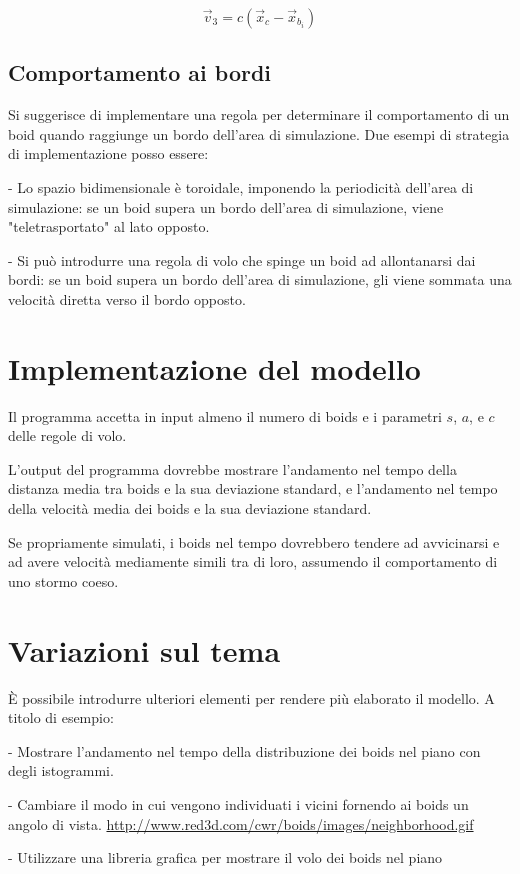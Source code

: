\documentclass[]{article}
\begin{document}
$$\vec{v}_3 = c(\vec{x}_{c}-\vec{x}_{b_i})$$

\subsection{Comportamento ai bordi}

Si suggerisce di implementare una regola per determinare il comportamento di un boid
quando raggiunge un bordo dell'area di simulazione. Due esempi di strategia di implementazione
posso essere:

- Lo spazio bidimensionale è toroidale, imponendo la periodicità dell'area di simulazione: se un boid supera un bordo
dell'area di simulazione, viene "teletrasportato" al lato opposto.

- Si può introdurre una regola di volo che spinge un boid ad allontanarsi dai bordi: se un boid supera un bordo dell'area di simulazione, gli viene sommata una velocità diretta verso il bordo opposto.

\section{Implementazione del modello}

Il programma accetta in input almeno il numero di boids e i parametri $s$, $a$, e $c$ delle regole di volo.

L'output del programma dovrebbe mostrare l'andamento nel tempo della distanza media tra boids e la sua deviazione standard, e l'andamento nel tempo della velocità media dei boids e la sua deviazione standard.

Se propriamente simulati, i boids nel tempo dovrebbero tendere ad avvicinarsi e ad avere velocità mediamente simili tra di loro, assumendo il comportamento di uno stormo coeso.

\section{Variazioni sul tema}

È possibile introdurre ulteriori elementi per rendere
più elaborato il modello. A titolo di esempio:

- Mostrare l'andamento nel tempo della distribuzione dei boids nel piano con degli istogrammi.

- Cambiare il modo in cui vengono individuati i vicini fornendo ai boids un angolo di vista. \href{esempio}{http://www.red3d.com/cwr/boids/images/neighborhood.gif}

- Utilizzare una libreria grafica per mostrare il volo dei boids nel piano
\end{document}
